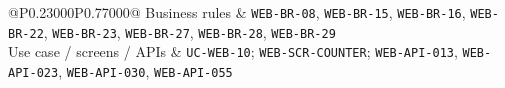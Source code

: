 \begin{longtable}{@{}P{0.23000\SRSWidth}P{0.77000\SRSWidth}@{}}
Business rules & \texttt{WEB-\allowbreak{}BR-\allowbreak{}08}, \texttt{WEB-\allowbreak{}BR-\allowbreak{}15}, \texttt{WEB-\allowbreak{}BR-\allowbreak{}16}, \texttt{WEB-\allowbreak{}BR-\allowbreak{}22}, \texttt{WEB-\allowbreak{}BR-\allowbreak{}23}, \texttt{WEB-\allowbreak{}BR-\allowbreak{}27}, \texttt{WEB-\allowbreak{}BR-\allowbreak{}28}, \texttt{WEB-\allowbreak{}BR-\allowbreak{}29} \\[3pt]
Use case /\allowbreak{} screens /\allowbreak{} APIs & \texttt{UC-\allowbreak{}WEB-\allowbreak{}10}; \texttt{WEB-\allowbreak{}SCR-\allowbreak{}COUNTER}; \texttt{WEB-\allowbreak{}API-\allowbreak{}013}, \texttt{WEB-\allowbreak{}API-\allowbreak{}023}, \texttt{WEB-\allowbreak{}API-\allowbreak{}030}, \texttt{WEB-\allowbreak{}API-\allowbreak{}055} \\[3pt]
\end{longtable}
\endgroup

